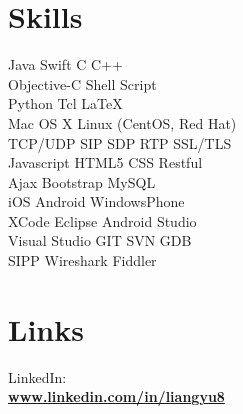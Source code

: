 \documentclass[a4paper]{lyu-resume} %
\begin{document}
\begin{minipage}[t]{0.33\textwidth} %


\section{Skills}

Java \textbullet{} Swift \textbullet{} C \textbullet{} C++\\
Objective-C \textbullet{} Shell Script \\
Python \textbullet{} Tcl \textbullet{} \LaTeX\\
Mac OS X \textbullet{} Linux (CentOS, Red Hat)\\
TCP/UDP \textbullet{} SIP \textbullet{} SDP \textbullet{} RTP \textbullet{} SSL/TLS\\
Javascript \textbullet{} HTML5 \textbullet{} CSS \textbullet{} Restful \\
Ajax \textbullet{} Bootstrap \textbullet{} MySQL \\ 
iOS \textbullet{} Android \textbullet{} WindowsPhone \\
XCode \textbullet{} Eclipse \textbullet{} Android Studio\\
Visual Studio \textbullet{} GIT \textbullet{} SVN \textbullet{} GDB\\
SIPP \textbullet{} Wireshark \textbullet{} Fiddler
\sectionspace %


\section{Links} 

LinkedIn:\\
\href{https://www.linkedin.com/in/liangyu8}{\bf www.linkedin.com/in/liangyu8} \\

\sectionspace %



\end{minipage}
\end{document}
